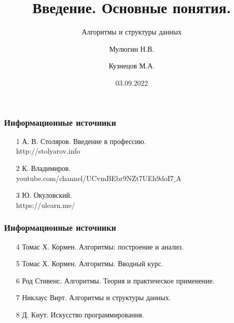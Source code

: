 \documentclass[russian, 12pt]{beamer}
\title{Введение. Основные понятия.}
\subtitle{Алгоритмы и структуры данных}
\author{
  Мулюгин Н.\texorpdfstring{\thinspace}{Lg}В.
  \and
  Кузнецов М.\texorpdfstring{\thinspace}{Lg}А.
  }
\date{03.09.2022}
\begin{document}
\begin{frame}
\titlepage
\end{frame}
\begin{frame}
\frametitle{Информационные источники}
  \begin{itemize}
    \item [1] А. В. Столяров. Введение в профессию.\\
      http://stolyarov.info\\[0.5cm]

    \item [2] К. Владимиров.\\
    youtube.com/channel/UCvmBEbr9NZt7UEh9doI7$\_$A\\[0.5cm]

    \item [3] Ю. Окуловский.\\ 
    https://ulearn.me/

  \end{itemize}
\end{frame}
\begin{frame}
\frametitle{Информационные источники}
  \begin{itemize}
    \item [4] Томас Х. Кормен. Алгоритмы: построение и анализ.\\[0.5cm]

    \item [5] Томас Х. Кормен. Алгоритмы. Вводный курс.\\[0.5cm]

    \item [6] Род Стивенс. Алгоритмы. Теория и практическое применение.\\[0.5cm]
    
    \item [7] Никлаус Вирт. Алгоритмы и структуры данных.\\[0.5cm]
    
    \item [8] Д. Кнут. Искусство программирования.

  \end{itemize}
\end{frame}
\end{document}
